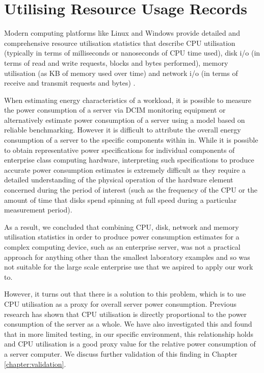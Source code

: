 \section{Utilising Resource Usage Records}

Modern computing platforms like Linux and Windows provide detailed and comprehensive resource utilisation statistics that describe CPU utilisation (typically in terms of milliseconds or nanoseconds of CPU time used), disk i/o (in terms of read and write requests, blocks and bytes performed), memory utilisation (as KB of memory used over time) and network i/o (in terms of receive and transmit requests and bytes) \cite{unix_sar_command, windows_performance_monitor}.

When estimating energy characteristics of a workload, it is possible to measure the power consumption of a server via DCIM monitoring equipment or alternatively estimate power consumption of a server using a model based on reliable benchmarking.  However it is difficult to attribute the overall energy consumption of a server to the specific components within in.  While it is possible to obtain representative power specifications \cite{hitachi_drive_data_sheet} for individual components of enterprise class computing hardware, interpreting such specifications to produce accurate power consumption estimates is extremely difficult as they require a detailed understanding of the physical operation of the hardware element concerned during the period of interest (such as the frequency of the CPU or the amount of time that disks spend spinning at full speed during a particular measurement period).

As a result, we concluded that combining CPU, disk, network and memory utilisation statistics in order to produce power consumption estimates for a complex computing device, such as an enterprise server, was not a practical approach for anything other than the smallest laboratory examples and so was not suitable for the large scale enterprise use that we aspired to apply our work to.

However, it turns out that there is a solution to this problem, which is to use CPU utilisation as a proxy for overall server power consumption.  Previous research \cite{bashroush2018_hardwarerefresh} has shown that CPU utilisation is directly proportional to the power consumption of the server as a whole.  We have also investigated this and found that in more limited testing, in our specific environment, this relationship holds and CPU utilisation is a good proxy value for the relative power consumption of a server computer.  We discuss further validation of this finding in Chapter \ref{chapter:validation}.

